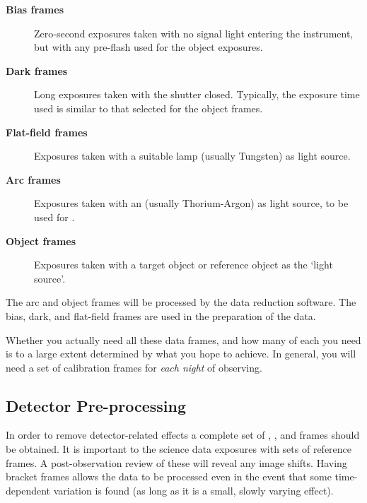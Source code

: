 \documentclass[twoside,11pt]{starlink}
\begin{document}
\begin{description}

\item [\textbf{Bias frames}]
      Zero-second exposures taken with no signal light entering the
      instrument, but with any pre-flash used for the object exposures.

\item [\textbf{Dark frames}]
      Long exposures taken with the shutter closed.  Typically, the
      exposure time used is similar to that selected for the object
      frames.

\item [\textbf{Flat-field frames}]
      Exposures taken with a suitable 
      lamp (usually Tungsten) as light source.

\item [\textbf{Arc frames}]
      Exposures taken with an 
      (usually Thorium-Argon) as
      light source, to be used for .

\item [\textbf{Object frames}]
      Exposures taken with a target object or reference object as the
      `light source'.

\end{description}

The arc and object frames will be processed by the data reduction software.
The bias, dark, and flat-field frames are used in the preparation of the
 data.

Whether you actually need all these data frames, and how many of each
you need is to a large extent determined by what you hope to achieve.
In general, you will need a set of calibration frames for \emph{each
night} of observing.


\subsection{Detector Pre-processing}

In order to remove detector-related effects a complete set of
, ,
and
 frames should be obtained.
It is important to \emph{} the science data exposures with
sets of 
reference frames.  A post-observation review of these will reveal
any image shifts.  Having bracket frames allows the data to be
processed even in the event that some time-dependent variation
is found (as long as it is a small, slowly varying effect).
\end{document}
